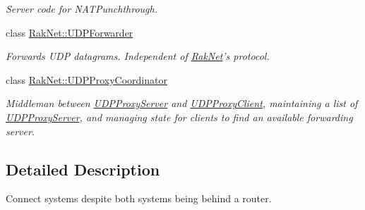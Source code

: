\begin{DoxyCompactItemize}
\begin{DoxyCompactList}\small\item\em Server code for N\-A\-T\-Punchthrough. \end{DoxyCompactList}\item 
class \hyperlink{class_rak_net_1_1_u_d_p_forwarder}{Rak\-Net\-::\-U\-D\-P\-Forwarder}
\begin{DoxyCompactList}\small\item\em Forwards U\-D\-P datagrams. Independent of \hyperlink{namespace_rak_net}{Rak\-Net}'s protocol. \end{DoxyCompactList}\item 
class \hyperlink{class_rak_net_1_1_u_d_p_proxy_coordinator}{Rak\-Net\-::\-U\-D\-P\-Proxy\-Coordinator}
\begin{DoxyCompactList}\small\item\em Middleman between \hyperlink{class_rak_net_1_1_u_d_p_proxy_server}{U\-D\-P\-Proxy\-Server} and \hyperlink{class_rak_net_1_1_u_d_p_proxy_client}{U\-D\-P\-Proxy\-Client}, maintaining a list of \hyperlink{class_rak_net_1_1_u_d_p_proxy_server}{U\-D\-P\-Proxy\-Server}, and managing state for clients to find an available forwarding server. \end{DoxyCompactList}\end{DoxyCompactItemize}


\subsection{Detailed Description}
Connect systems despite both systems being behind a router. 